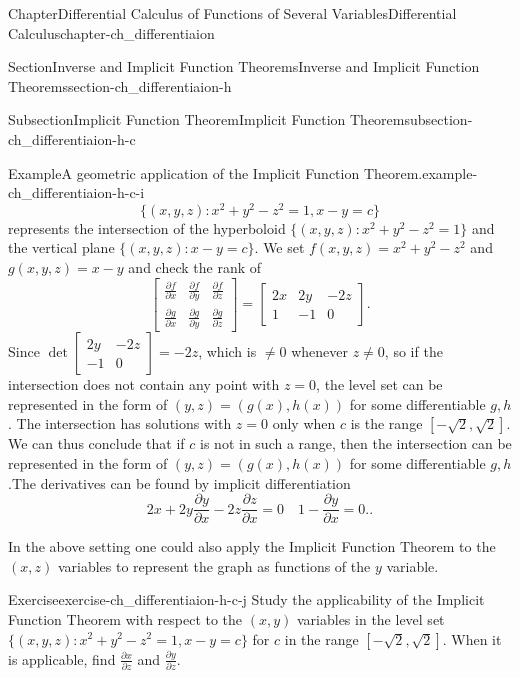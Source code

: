 \documentclass[oneside,10pt,]{book}
\numberwithin{equation}{section}
\newcommand{\amp}{&}
\begin{document}
\begin{chapterptx}{Chapter}{Differential Calculus of Functions of Several Variables}{}{Differential Calculus}{}{}{chapter-ch_differentiaion}
\begin{sectionptx}{Section}{Inverse and Implicit Function Theorems}{}{Inverse and Implicit Function Theorems}{}{}{section-ch_differentiaion-h}
\begin{subsectionptx}{Subsection}{Implicit Function Theorem}{}{Implicit Function Theorem}{}{}{subsection-ch_differentiaion-h-c}
\begin{example}{Example}{A geometric application of the Implicit Function Theorem.}{example-ch_differentiaion-h-c-i}
\begin{equation*}
\{(x, y, z): x^{2}+y^{2}-z^{2}=1, x -y =c\}
\end{equation*}
represents the intersection of the hyperboloid \(\{(x, y, z): x^{2}+y^{2}-z^{2}=1\}\) and the vertical plane \(\{(x, y, z):  x -y =c\}\).  We set \(f(x, y, z)= x^{2}+y^{2}-z^{2}\) and \(g(x, y, z)=x-y\) and check the rank of%
\begin{equation*}
\begin{bmatrix} \frac{\partial f}{\partial x} \amp \frac{\partial f}{\partial y}
\amp \frac{\partial f}{\partial z} \\
\frac{\partial g}{\partial x} \amp \frac{\partial g}{\partial y}
\amp \frac{\partial g}{\partial z} \end{bmatrix}
=\begin{bmatrix} 2x \amp 2y \amp -2z \\ 1 \amp -1 \amp 0 \end{bmatrix}\text{.}
\end{equation*}
Since \(\det \begin{bmatrix}  2y \amp -2z \\  -1 \amp 0 \end{bmatrix}=-2z\), which is \(\ne 0\) whenever \(z\ne 0\), so if the intersection does not contain any point with \(z=0\), the level set can be represented in the form of \((y, z)=(g(x), h(x))\) for some differentiable \(g, h\).  The intersection has solutions with \(z=0\) only when \(c\) is the range \([-\sqrt 2, \sqrt 2]\). We can  thus conclude that if \(c\) is not in such a range, then the intersection can be represented in the form of \((y, z)=(g(x), h(x))\) for some differentiable \(g, h\).The derivatives can be found by  implicit differentiation%
\begin{equation*}
2x + 2y \frac{\partial y}{\partial x} - 2 z \frac{\partial z}{\partial x}=0\quad 1-\frac{\partial y}{\partial x}=0.\text{.}
\end{equation*}
%
\par
In the above setting one could also apply the Implicit Function Theorem to the \((x, z)\) variables to represent the graph as functions of the \(y\) variable.%
\end{example}
\begin{inlineexercise}{Exercise}{}{exercise-ch_differentiaion-h-c-j}%
Study the applicability of the Implicit Function Theorem with respect to the \((x, y)\) variables in the level set \(\{(x, y, z): x^{2}+y^{2}-z^{2}=1, x -y =c\}\) for \(c\) in the range \([-\sqrt 2, \sqrt 2]\). When it is applicable, find \(\frac{\partial x}{\partial z}\) and \(\frac{\partial y}{\partial z}\).\end{inlineexercise}%

\end{subsectionptx}
\end{sectionptx}
\end{chapterptx}
\end{document}

